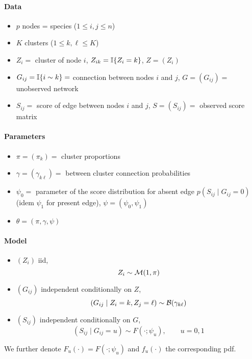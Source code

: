 \paragraph{Data}
\begin{itemize}
 \item $p$ nodes = species ($1 \leq i, j \leq n$)
 \item $K$ clusters  ($1 \leq k, \ell \leq K$)
 \item $Z_i =$ cluster of node $i$, $Z_{ik} = \mathbb I\{Z_i = k\}$, $Z = (Z_i)$
 \item $G_{ij} = \mathbb I\{i \sim k\} = $ connection between nodes $i$ and $j$, $G = (G_{ij}) =$ unobserved network
 \item $S_{ij} = $ score of edge between nodes $i$ and $j$, $S = (S_{ij}) =$ observed score matrix
\end{itemize}

\paragraph{Parameters}
\begin{itemize}
 \item $\pi = (\pi_k) =$ cluster proportions
 \item $\gamma = (\gamma_{k\ell}) =$ between cluster connection probabilities
 \item $\psi_0 =$ parameter of the score distribution for absent edge $p(S_{ij} \mid G_{ij} = 0)$ (idem $\psi_1$ for present edge), $\psi = (\psi_0, \psi_1)$
 \item $\theta = (\pi, \gamma, \psi)$
\end{itemize}

\paragraph{Model}
\begin{itemize}
 \item $(Z_i)$ iid, $$Z_i \sim \mathcal{M}(1, \pi)$$
 \item $(G_{ij})$ independent conditionally on $Z$,
 $$
 (G_{ij} \mid Z_i = k, Z_j = \ell) \sim \mathcal{B}(\gamma_{k\ell})
 $$
 \item $(S_{ij})$ independent conditionally on $G$,
 $$
 (S_{ij} \mid G_{ij} = u) \sim F(\cdot; \psi_u), \qquad u = 0, 1
 $$
\end{itemize}
We further denote $F_u(\cdot) = F(\cdot; \psi_u)$ and $f_u(\cdot)$ the corresponding pdf.
